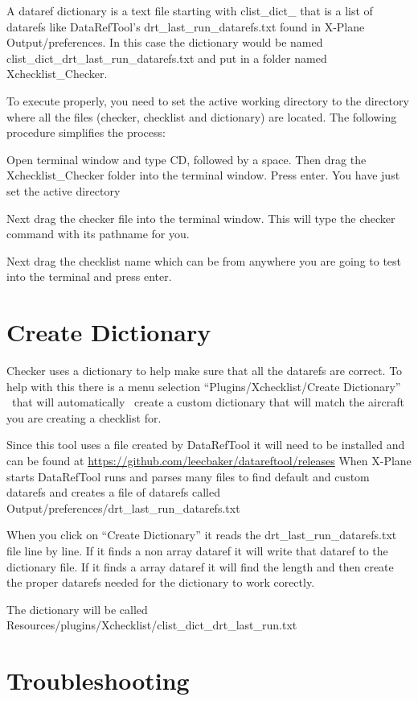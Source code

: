 \documentclass[11pt,parskip=half,a4paper]{scrartcl}
\begin{document}
A dataref dictionary is a text file starting with clist\_dict\_ that is a list of datarefs like DataRefTool's
drt\_last\_run\_datarefs.txt found in X-Plane Output/preferences. In this case the dictionary would be named
clist\_dict\_drt\_last\_run\_datarefs.txt and put in a folder named Xchecklist\_Checker.

To execute properly, you need to set the active working directory to the directory where all the files (checker,
checklist and dictionary) are located. The following procedure simplifies the process:

Open terminal window and type CD, followed by a space. Then drag the Xchecklist\_Checker folder into the terminal window. Press enter. You have just set the active directory

Next drag the checker file into the terminal window. This will type the checker command with its pathname for you.

Next drag the checklist name which can be from anywhere you are going to test into the terminal and press enter.

\newpage
\section{Create Dictionary}


Checker uses a dictionary to help make sure that all the datarefs are correct. To help with this there is a menu
selection ``Plugins/Xchecklist/Create Dictionary'' \ that will automatically \ create a custom dictionary that will match the aircraft you are creating a checklist for.

Since this tool uses a file created by DataRefTool it will need to be installed and can be found at
\url{https://github.com/leecbaker/datareftool/releases} When X-Plane starts DataRefTool runs and parses many files to find default and custom datarefs and creates a file of datarefs called
Output/preferences/drt\_last\_run\_datarefs.txt

When you click on ``Create Dictionary'' it reads the drt\_last\_run\_datarefs.txt file line by line. If it finds a non array dataref it will write that dataref to the dictionary file. If it finds a array dataref it will find the length and then create the proper datarefs needed for the dictionary to work corectly. 

The dictionary will be called Resources/plugins/Xchecklist/clist\_dict\_drt\_last\_run.txt

\section{Troubleshooting}
\end{document}
